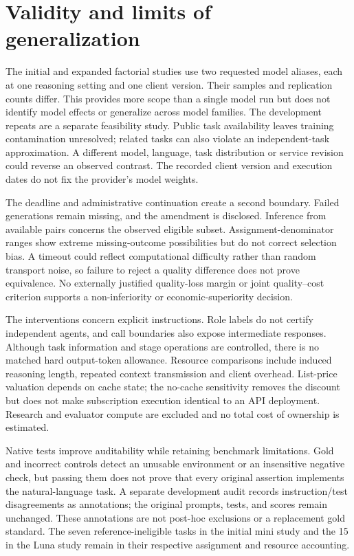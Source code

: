 \section{Validity and limits of generalization}
\label{sec:heldout-limits}
The initial and expanded factorial studies use two requested model aliases, each at one reasoning setting and one client version. Their samples and replication counts differ. This provides more scope than a single model run but does not identify model effects or generalize across model families. The development repeats are a separate feasibility study. Public task availability leaves training contamination unresolved; related tasks can also violate an independent-task approximation. A different model, language, task distribution or service revision could reverse an observed contrast. The recorded client version and execution dates do not fix the provider's model weights.

The deadline and administrative continuation create a second boundary. Failed generations remain missing, and the amendment is disclosed. Inference from available pairs concerns the observed eligible subset. Assignment-denominator ranges show extreme missing-outcome possibilities but do not correct selection bias. A timeout could reflect computational difficulty rather than random transport noise, so failure to reject a quality difference does not prove equivalence. No externally justified quality-loss margin or joint quality--cost criterion supports a non-inferiority or economic-superiority decision.

The interventions concern explicit instructions. Role labels do not certify independent agents, and call boundaries also expose intermediate responses. Although task information and stage operations are controlled, there is no matched hard output-token allowance. Resource comparisons include induced reasoning length, repeated context transmission and client overhead. List-price valuation depends on cache state; the no-cache sensitivity removes the discount but does not make subscription execution identical to an API deployment. Research and evaluator compute are excluded and no total cost of ownership is estimated.

Native tests improve auditability while retaining benchmark limitations. Gold and incorrect controls detect an unusable environment or an insensitive negative check, but passing them does not prove that every original assertion implements the natural-language task. A separate development audit records instruction/test disagreements as annotations; the original prompts, tests, and scores remain unchanged. These annotations are not post-hoc exclusions or a replacement gold standard. The seven reference-ineligible tasks in the initial mini study and the 15 in the Luna study remain in their respective assignment and resource accounting.

